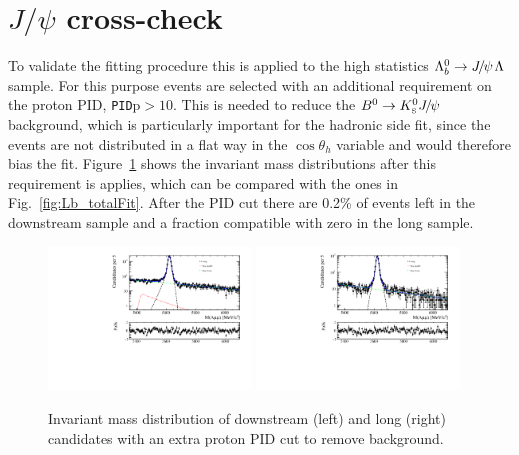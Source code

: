 \section{$J/\psi$ cross-check}

To validate the fitting procedure this is applied to the high statistics $\Lb\to\jpsi\Lz$ sample.
For this purpose events are selected with an additional requirement on the proton PID, \verb!PID!p$ > 10$.
This is needed to reduce the $\Bz\to\KS\jpsi$ background, which is particularly important for the hadronic side fit, 
since the \KS events are not distributed in a flat way in the $\cos\theta_h$ variable and would therefore bias the fit.
Figure~\ref{fig:Jpsimass_angular} shows the invariant mass distributions after this requirement is applies, which 
can be compared with the ones in Fig.~\ref{fig:Lb_totalFit}. %
After the PID cut there are 0.2\% of \KS events left in the downstream sample and a fraction
compatible with zero in the long sample.
%
\begin{figure}[b]
\centering
\includegraphics[width=0.48\textwidth]{Lmumu/figs/Jpsi_default_DD_log_fitAndRes.pdf}
\includegraphics[width=0.48\textwidth]{Lmumu/figs/Jpsi_default_LL_log_fitAndRes.pdf}
\caption{Invariant mass distribution of \Lb\ra\jpsi\Lz downstream (left) and long (right)
candidates with an extra proton PID cut to remove \KS background. }
\label{fig:Jpsimass_angular}
\end{figure}
%
